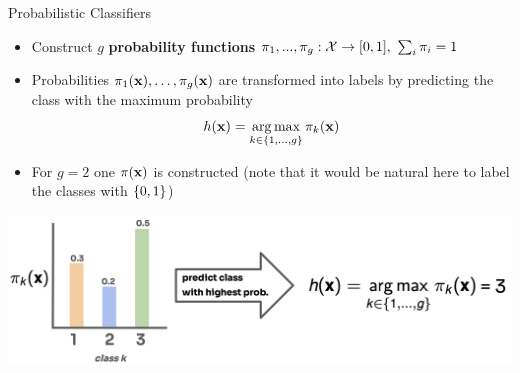 \documentclass[11pt,compress,t,notes=noshow, xcolor=table]{beamer}
\begin{document}
\begin{vbframe}{Probabilistic Classifiers}
\begin{itemize}
\item Construct $g$ \textbf{probability functions} $\pi_1, ..., \pi_g: \Xspace \to [0, 1],~\sum_i \pi_i = 1$ 
\item Probabilities $\pi_1(\xv), \ldots, \pikx[g]$ are transformed into labels by predicting the class with the maximum probability
$$
\hx = \argmax_{k \in \gset} \pikx
$$ 
\item For $g = 2$ one $\pix$ is constructed (note that it would be natural here to label the classes with $\setzo$)
\end{itemize}


\begin{center}
  \includegraphics{figure_man/probabilities.png} 
\end{center}
\end{vbframe}
\end{document}
